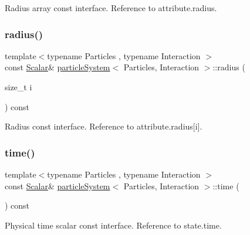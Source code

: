 Radius array const interface. Reference to attribute.\+radius. 

\mbox{\label{classparticle_system_a1986f65f13b773a51b19eba1ccd6c46a}} 
\subsubsection{\texorpdfstring{radius()}{radius()}\hspace{0.1cm}{\footnotesize\ttfamily [2/2]}}
{\footnotesize\ttfamily template$<$typename Particles , typename Interaction $>$ \\
const \mbox{\hyperlink{classparticle_system_a3938954186247e3eab01cc75fcc62b40}{Scalar}}\& \mbox{\hyperlink{classparticle_system}{particle\+System}}$<$ Particles, Interaction $>$\+::radius (\begin{DoxyParamCaption}\item[{size\+\_\+t}]{i }\end{DoxyParamCaption}) const\hspace{0.3cm}{\ttfamily [inline]}}



Radius const interface. Reference to attribute.\+radius\mbox{[}i\mbox{]}. 

\mbox{\label{classparticle_system_a25bf169b4acd1ede1dd03a218d5f105c}} 
\subsubsection{\texorpdfstring{time()}{time()}}
{\footnotesize\ttfamily template$<$typename Particles , typename Interaction $>$ \\
const \mbox{\hyperlink{classparticle_system_a3938954186247e3eab01cc75fcc62b40}{Scalar}}\& \mbox{\hyperlink{classparticle_system}{particle\+System}}$<$ Particles, Interaction $>$\+::time (\begin{DoxyParamCaption}{ }\end{DoxyParamCaption}) const\hspace{0.3cm}{\ttfamily [inline]}}



Physical time scalar const interface. Reference to state.\+time. 

